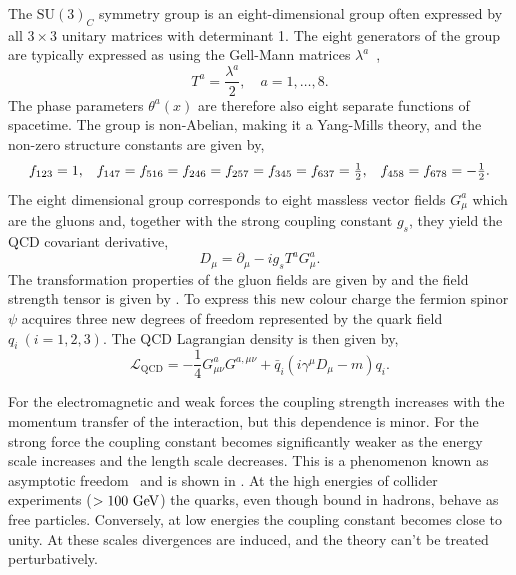 The $\text{SU}(3)_C$ symmetry group is an eight-dimensional group often expressed by all $3 \times 3$ unitary matrices with determinant 1.
The eight generators of the group are typically expressed as using the Gell-Mann matrices $\lambda^a$~\cite{GellManMatrix},
\begin{equation}
	\label{eq:su3_generators}
	T^a = \frac{\lambda^a}{2}, \quad a = 1, \ldots, 8.
\end{equation}
The phase parameters $\theta^a(x)$ are therefore also eight separate functions of spacetime.
The group is non-Abelian, making it a Yang-Mills theory, and the non-zero structure constants are given by,
\begin{equation}
	\label{eq:qcd_sc}
	\begin{array}{ccc}
		f_{123} = 1 ,                                                            & \hspace{\stretch{1}}
		f_{147} = f_{516} = f_{246} = f_{257} = f_{345} = f_{637} = \frac{1}{2}, & \hspace{\stretch{1}}
		f_{458} = f_{678} = -\frac{1}{2}.
	\end{array}
\end{equation}
The eight dimensional group corresponds to eight massless vector fields $G_\mu^a$ which are the gluons and, together with the strong coupling constant $g_s$, they yield the QCD covariant derivative,
\begin{equation}
	\label{eq:qcd_covariant_derivative}
	D_\mu = \partial_\mu - i g_s T^a G_\mu^a.
\end{equation}
The transformation properties of the gluon fields are given by  and the field strength tensor is given by .
To express this new colour charge the fermion spinor $\psi$ acquires three new degrees of freedom represented by the quark field $q_i\:(i = 1, 2, 3)$.
The QCD Lagrangian density is then given by,
\begin{equation}
	\label{eq:qcd_lagrangian}
	\mathcal{L}_\text{QCD} = -\frac{1}{4} G_{\mu\nu}^a G^{a,\mu\nu} + \bar q_i (i \gamma^\mu D_\mu - m) q_i.
\end{equation}

For the electromagnetic and weak forces the coupling strength increases with the momentum transfer of the interaction, but this dependence is minor.
For the strong force the coupling constant becomes significantly weaker as the energy scale increases and the length scale decreases.
This is a phenomenon known as asymptotic freedom~\cite{PriceAsymptoticFreedom} and is shown in .
At the high energies of collider experiments ($ > 100~\GeV$) the quarks, even though bound in hadrons, behave as free particles.
Conversely, at low energies the coupling constant becomes close to unity.
At these scales divergences are induced, and the theory can't be treated perturbatively.


